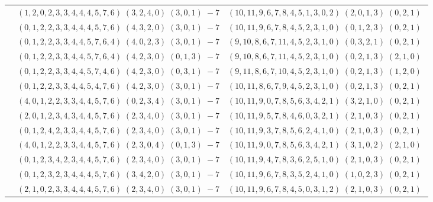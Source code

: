 \documentclass[11pt]{article}
\begin{document}
\begin{longtable}[l]{|c|c|c|}
 \cline{2-3} 
 & $(1 ,2 ,0 ,2 ,3 ,3 ,4 ,4 ,4 ,5 ,7 ,6) \;(3 ,2 ,4 ,0) \;(3 ,0 ,1) \;-7$ & $(10 ,11 ,9 ,6 ,7 ,8 ,4 ,5 ,1 ,3 ,0 ,2) \;(2 ,0 ,1 ,3) \;(0 ,2 ,1) \;$\\ 
 \cline{2-3} 
 & $(0 ,1 ,2 ,2 ,3 ,3 ,4 ,4 ,4 ,5 ,7 ,6) \;(4 ,3 ,2 ,0) \;(3 ,0 ,1) \;-7$ & $(10 ,11 ,9 ,6 ,7 ,8 ,4 ,5 ,2 ,3 ,1 ,0) \;(0 ,1 ,2 ,3) \;(0 ,2 ,1) \;$\\ 
 \cline{2-3} 
 & $(0 ,1 ,2 ,2 ,3 ,3 ,4 ,4 ,5 ,7 ,6 ,4) \;(4 ,0 ,2 ,3) \;(3 ,0 ,1) \;-7$ & $(9 ,10 ,8 ,6 ,7 ,11 ,4 ,5 ,2 ,3 ,1 ,0) \;(0 ,3 ,2 ,1) \;(0 ,2 ,1) \;$\\ 
 \cline{2-3} 
 & $(0 ,1 ,2 ,2 ,3 ,3 ,4 ,4 ,5 ,7 ,6 ,4) \;(4 ,2 ,3 ,0) \;(0 ,1 ,3) \;-7$ & $(9 ,10 ,8 ,6 ,7 ,11 ,4 ,5 ,2 ,3 ,1 ,0) \;(0 ,2 ,1 ,3) \;(2 ,1 ,0) \;$\\ 
 \cline{2-3} 
 & $(0 ,1 ,2 ,2 ,3 ,3 ,4 ,4 ,5 ,7 ,4 ,6) \;(4 ,2 ,3 ,0) \;(0 ,3 ,1) \;-7$ & $(9 ,11 ,8 ,6 ,7 ,10 ,4 ,5 ,2 ,3 ,1 ,0) \;(0 ,2 ,1 ,3) \;(1 ,2 ,0) \;$\\ 
 \cline{2-3} 
 & $(0 ,1 ,2 ,2 ,3 ,3 ,4 ,4 ,5 ,4 ,7 ,6) \;(4 ,2 ,3 ,0) \;(3 ,0 ,1) \;-7$ & $(10 ,11 ,8 ,6 ,7 ,9 ,4 ,5 ,2 ,3 ,1 ,0) \;(0 ,2 ,1 ,3) \;(0 ,2 ,1) \;$\\ 
 \cline{2-3} 
 & $(4 ,0 ,1 ,2 ,2 ,3 ,3 ,4 ,4 ,5 ,7 ,6) \;(0 ,2 ,3 ,4) \;(3 ,0 ,1) \;-7$ & $(10 ,11 ,9 ,0 ,7 ,8 ,5 ,6 ,3 ,4 ,2 ,1) \;(3 ,2 ,1 ,0) \;(0 ,2 ,1) \;$\\ 
 \cline{2-3} 
 & $(2 ,0 ,1 ,2 ,3 ,4 ,3 ,4 ,4 ,5 ,7 ,6) \;(2 ,3 ,4 ,0) \;(3 ,0 ,1) \;-7$ & $(10 ,11 ,9 ,5 ,7 ,8 ,4 ,6 ,0 ,3 ,2 ,1) \;(2 ,1 ,0 ,3) \;(0 ,2 ,1) \;$\\ 
 \cline{2-3} 
 & $(0 ,1 ,2 ,4 ,2 ,3 ,3 ,4 ,4 ,5 ,7 ,6) \;(2 ,3 ,4 ,0) \;(3 ,0 ,1) \;-7$ & $(10 ,11 ,9 ,3 ,7 ,8 ,5 ,6 ,2 ,4 ,1 ,0) \;(2 ,1 ,0 ,3) \;(0 ,2 ,1) \;$\\ 
 \cline{2-3} 
 & $(4 ,0 ,1 ,2 ,2 ,3 ,3 ,4 ,4 ,5 ,7 ,6) \;(2 ,3 ,0 ,4) \;(0 ,1 ,3) \;-7$ & $(10 ,11 ,9 ,0 ,7 ,8 ,5 ,6 ,3 ,4 ,2 ,1) \;(3 ,1 ,0 ,2) \;(2 ,1 ,0) \;$\\ 
 \cline{2-3} 
 & $(0 ,1 ,2 ,3 ,4 ,2 ,3 ,4 ,4 ,5 ,7 ,6) \;(2 ,3 ,4 ,0) \;(3 ,0 ,1) \;-7$ & $(10 ,11 ,9 ,4 ,7 ,8 ,3 ,6 ,2 ,5 ,1 ,0) \;(2 ,1 ,0 ,3) \;(0 ,2 ,1) \;$\\ 
 \cline{2-3} 
 & $(0 ,1 ,2 ,3 ,2 ,3 ,4 ,4 ,4 ,5 ,7 ,6) \;(3 ,4 ,2 ,0) \;(3 ,0 ,1) \;-7$ & $(10 ,11 ,9 ,6 ,7 ,8 ,3 ,5 ,2 ,4 ,1 ,0) \;(1 ,0 ,2 ,3) \;(0 ,2 ,1) \;$\\ 
 \cline{2-3} 
 & $(2 ,1 ,0 ,2 ,3 ,3 ,4 ,4 ,4 ,5 ,7 ,6) \;(2 ,3 ,4 ,0) \;(3 ,0 ,1) \;-7$ & $(10 ,11 ,9 ,6 ,7 ,8 ,4 ,5 ,0 ,3 ,1 ,2) \;(2 ,1 ,0 ,3) \;(0 ,2 ,1) \;$\\ 

\end{longtable}
\end{document}
